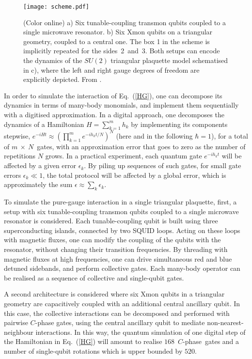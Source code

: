 \documentclass[epj,final]{svjour}
\begin{document}
\begin{figure}
\texttt{[image: scheme.pdf]}
\caption{(Color online) a) Six tunable-coupling transmon qubits coupled to a single microwave resonator. b) Six Xmon qubits on a triangular geometry, coupled to a central one. The box 1 in the scheme is implicitly repeated for the sides~2~and~3. Both setups can encode the dynamics of the $SU(2)$ triangular plaquette model schematised in c), where the left and right gauge degrees of freedom are explicitly depicted.\label{scheme} From \cite{mezzacapo2015non}.}
\end{figure}

In order to simulate the interaction of Eq.~(\ref{HG}), one can decompose its dynamics in terms of many-body monomials, and implement them sequentially with a digitised approximation. In a digital approach, one decomposes the dynamics of a Hamiltonian $H=\sum_{k=1}^mh_k$ by implementing its components stepwise, $e^{-iHt}\approx\left(\prod_{k=1}^m e^{-ih_kt/N}\right)^N$ (here and in the following $\hbar=1$), for a total of $m~\times~N$~gates, with an approximation error that goes to zero as the number of repetitions $N$ grows. In a practical experiment, each quantum gate $e^{-ih_kt}$ will be affected by a given error $\epsilon_k$. By piling up sequences of such gates, for small gate errors $\epsilon_k \ll 1$, the total protocol will be affected by a global error, which is approximately the sum $\epsilon\approx\sum_k\epsilon_k$. 

To simulate the pure-gauge interaction in a single triangular plaquette, first, a setup with six tunable-coupling transmon qubits coupled to a single microwave resonator is considered. Each tunable-coupling qubit is built using three superconducting islands, connected by two SQUID loops. Acting on these loops with magnetic  fluxes, one can modify the coupling of the qubits with the resonator, without changing their transition frequencies. By threading with magnetic fluxes at high frequencies, one can drive simultaneous red and blue detuned sidebands, and perform collective gates. Each many-body operator can be realised as a sequence of collective and single-qubit gates.

A second architecture is considered where six Xmon qubits in a triangular geometry are capacitively coupled with an additional central ancillary qubit. In this case, the collective interactions can be decomposed and performed with pairwise $C$-phase gates, using the central ancillary qubit to mediate non-nearest-neighbour interactions. In this way, the quantum simulation of one digital step of the Hamiltonian in Eq.~(\ref{HG}) will amount to realise \mbox{$168$~$C$-phase~gates} and a number of single-qubit rotations which is upper bounded by $520$. 
\end{document}
